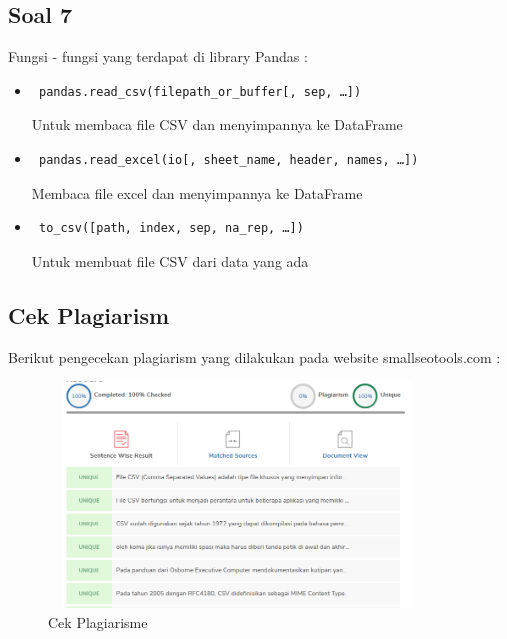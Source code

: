 \subsection{Soal 7}
Fungsi - fungsi yang terdapat di library Pandas : 
\begin{itemize}
	\item \begin{verbatim} pandas.read_csv(filepath_or_buffer[, sep, …]) \end{verbatim} Untuk membaca file CSV dan menyimpannya ke DataFrame
	\item \begin{verbatim} pandas.read_excel(io[, sheet_name, header, names, …])  \end{verbatim} Membaca file excel dan menyimpannya ke DataFrame
	\item \begin{verbatim} to_csv([path, index, sep, na_rep, …]) \end{verbatim}
	Untuk membuat file CSV dari data yang ada	
\end{itemize}
\subsection{Cek Plagiarism}
Berikut pengecekan plagiarism yang dilakukan pada website smallseotools.com : 
\begin{figure}[!htbp]
	\centering
	\includegraphics[height=6cm, width=10cm]{figures/4/1174035/Teori/1174035_plagiarism.png}
	\caption{Cek Plagiarisme}
	\label{1174035_CSVExcel}
\end{figure}